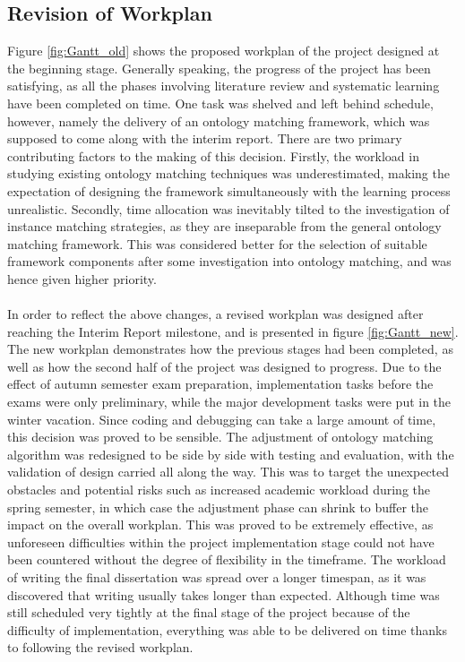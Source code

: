 \subsection{Revision of Workplan}
Figure \ref{fig:Gantt_old} shows the proposed workplan of the project designed at the beginning stage. Generally speaking, the progress of the project has been satisfying, as all the phases involving literature review and systematic learning have been completed on time. One task was shelved and left behind schedule, however, namely the delivery of an ontology matching framework, which was supposed to come along with the interim report. There are two primary contributing factors to the making of this decision. Firstly, the workload in studying existing ontology matching techniques was underestimated, making the expectation of designing the framework simultaneously with the learning process unrealistic. Secondly, time allocation was inevitably tilted to the investigation of instance matching strategies, as they are inseparable from the general ontology matching framework. This was considered better for the selection of suitable framework components after some investigation into ontology matching, and was hence given higher priority.
\\\\
In order to reflect the above changes, a revised workplan was designed after reaching the Interim Report milestone, and is presented in figure \ref{fig:Gantt_new}. The new workplan demonstrates how the previous stages had been completed, as well as how the second half of the project was designed to progress. Due to the effect of autumn semester exam preparation, implementation tasks before the exams were only preliminary, while the major development tasks were put in the winter vacation. Since coding and debugging can take a large amount of time, this decision was proved to be sensible. The adjustment of ontology matching algorithm was redesigned to be side by side with testing and evaluation, with the validation of design carried all along the way. This was to target the unexpected obstacles and potential risks such as increased academic workload during the spring semester, in which case the adjustment phase can shrink to buffer the impact on the overall workplan. This was proved to be extremely effective, as unforeseen difficulties within the project implementation stage could not have been countered without the degree of flexibility in the timeframe. The workload of writing the final dissertation was spread over a longer timespan, as it was discovered that writing usually takes longer than expected. Although time was still scheduled very tightly at the final stage of the project because of the difficulty of implementation, everything was able to be delivered on time thanks to following the revised workplan.

